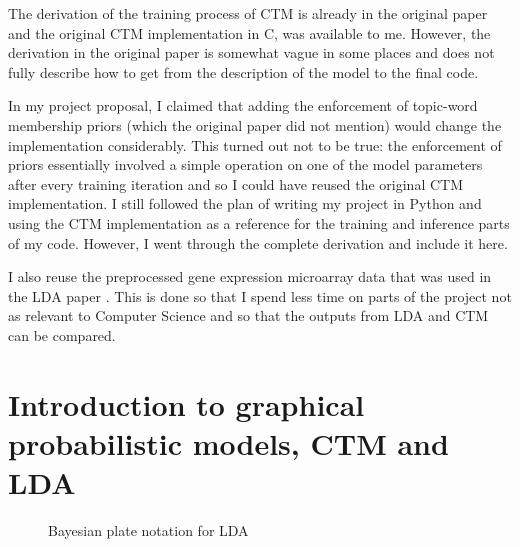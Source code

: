 \documentclass[12pt,a4paper,twoside,openright]{report}
\begin{document}
The derivation of the training process of CTM is already in the original paper \cite{Blei} and the original CTM implementation in C, was available to me. However, the derivation in the original paper is somewhat vague in some places and does not fully describe how to get from the description of the model to the final code.

In my project proposal, I claimed that adding the enforcement of topic-word membership priors (which the original paper did not mention) would change the implementation considerably. This turned out not to be true: the enforcement  of priors essentially involved a simple operation on one of the model parameters after every training iteration and so I could have reused the original CTM implementation. I still followed the plan of writing my project in Python and using the CTM implementation as a reference for the training and inference parts of my code. However, I went through the complete derivation and include it here.

I also reuse the preprocessed gene expression microarray data that was used in the LDA paper \cite{Pratanwanich2014}. This is done so that I spend less time on parts of the project not as relevant to Computer Science and so that the outputs from LDA and CTM can be compared.

\section{Introduction to graphical probabilistic models, CTM and LDA}

\begin{figure}
\caption{Bayesian plate notation for LDA}
\label{fig:plate-lda}
\end{figure}
\end{document}
